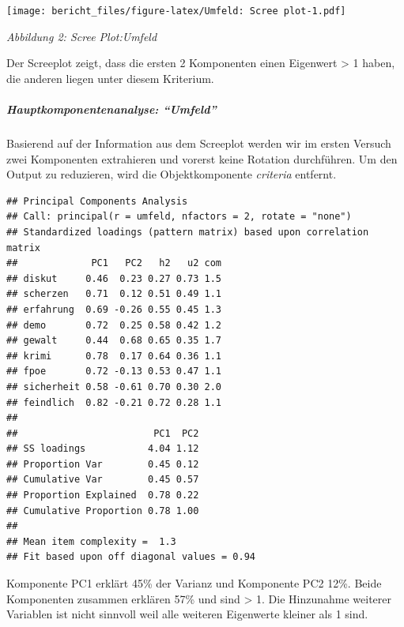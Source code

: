 \documentclass[]{article}
\newenvironment{Shaded}{\begin{snugshade}}{\end{snugshade}}
\newcommand{\KeywordTok}[1]{\textcolor[rgb]{0.13,0.29,0.53}{\textbf{{#1}}}}
\newcommand{\DataTypeTok}[1]{\textcolor[rgb]{0.13,0.29,0.53}{{#1}}}
\newcommand{\DecValTok}[1]{\textcolor[rgb]{0.00,0.00,0.81}{{#1}}}
\newcommand{\StringTok}[1]{\textcolor[rgb]{0.31,0.60,0.02}{{#1}}}
\newcommand{\OtherTok}[1]{\textcolor[rgb]{0.56,0.35,0.01}{{#1}}}
\newcommand{\NormalTok}[1]{{#1}}
\let\oldsubparagraph\subparagraph
\renewcommand{\subparagraph}[1]{\oldsubparagraph{#1}\mbox{}}
\begin{document}
\texttt{[image: bericht\_files/figure-latex/Umfeld: Scree plot-1.pdf]}

\begin{center}
\textit{Abbildung 2: Scree Plot:Umfeld}
\bigskip
\end{center}

Der Screeplot zeigt, dass die ersten 2 Komponenten einen Eigenwert
\textgreater{} 1 haben, die anderen liegen unter diesem Kriterium.

\subparagraph{\texorpdfstring{Hauptkomponentenanalyse:
``Umfeld''}{Hauptkomponentenanalyse: Umfeld}}\label{hauptkomponentenanalyse-umfeld}

Basierend auf der Information aus dem Screeplot werden wir im ersten
Versuch zwei Komponenten extrahieren und vorerst keine Rotation
durchführen. Um den Output zu reduzieren, wird die Objektkomponente
\emph{criteria} entfernt.

\begin{Shaded}
\end{Shaded}

\begin{verbatim}
## Principal Components Analysis
## Call: principal(r = umfeld, nfactors = 2, rotate = "none")
## Standardized loadings (pattern matrix) based upon correlation matrix
##             PC1   PC2   h2   u2 com
## diskut     0.46  0.23 0.27 0.73 1.5
## scherzen   0.71  0.12 0.51 0.49 1.1
## erfahrung  0.69 -0.26 0.55 0.45 1.3
## demo       0.72  0.25 0.58 0.42 1.2
## gewalt     0.44  0.68 0.65 0.35 1.7
## krimi      0.78  0.17 0.64 0.36 1.1
## fpoe       0.72 -0.13 0.53 0.47 1.1
## sicherheit 0.58 -0.61 0.70 0.30 2.0
## feindlich  0.82 -0.21 0.72 0.28 1.1
## 
##                        PC1  PC2
## SS loadings           4.04 1.12
## Proportion Var        0.45 0.12
## Cumulative Var        0.45 0.57
## Proportion Explained  0.78 0.22
## Cumulative Proportion 0.78 1.00
## 
## Mean item complexity =  1.3
## Fit based upon off diagonal values = 0.94
\end{verbatim}

Komponente PC1 erklärt 45\% der Varianz und Komponente PC2 12\%. Beide
Komponenten zusammen erklären 57\% und sind \textgreater{} 1. Die
Hinzunahme weiterer Variablen ist nicht sinnvoll weil alle weiteren
Eigenwerte kleiner als 1 sind.
\end{document}
